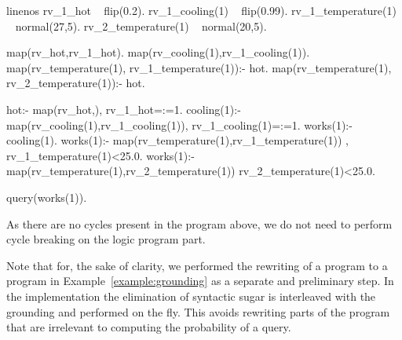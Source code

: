 \begin{example}
	\begin{dcplp*}{linenos}
rv_1_hot ~ flip(0.2). 
rv_1_cooling(1) ~ flip(0.99). 
rv_1_temperature(1) ~ normal(27,5).
rv_2_temperature(1) ~ normal(20,5).

map(rv_hot,rv_1_hot).
map(rv_cooling(1),rv_1_cooling(1)).
map(rv_temperature(1), rv_1_temperature(1)):- hot.
map(rv_temperature(1), rv_2_temperature(1)):- \+hot.

hot:- map(rv_hot,), rv_1_hot=:=1.
cooling(1):-
    map(rv_cooling(1),rv_1_cooling(1)), 
    rv_1_cooling(1)=:=1.
works(1):- cooling(1).
works(1):-
    map(rv_temperature(1),rv_1_temperature(1)) ,
    rv_1_temperature(1)<25.0.
works(1):-
    map(rv_temperature(1),rv_2_temperature(1)) 
    rv_2_temperature(1)<25.0.

query(works(1)).
	\end{dcplp*}
As there are no cycles present in the \dcplpsty program above, we do not need to perform cycle breaking on the logic program part.
\end{example}

Note that for, the sake of clarity, we performed the rewriting of a \dcproblogsty program to a \dcplpsty program in Example~\ref{example:grounding} as a separate and preliminary step. In the \dcproblogsys implementation the elimination of syntactic sugar is interleaved with the grounding and performed on the fly. This avoids rewriting parts of the program that are irrelevant to computing the probability of a query.





























